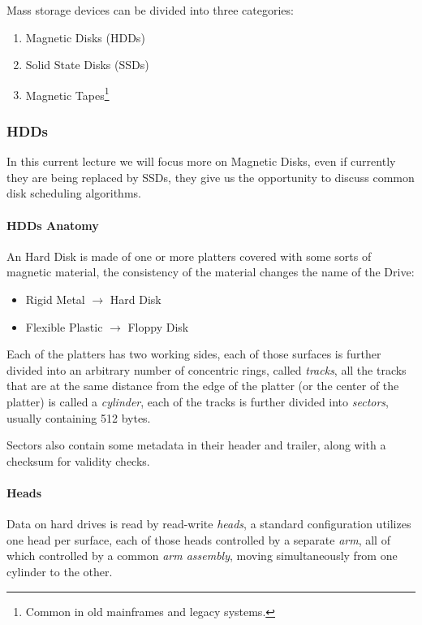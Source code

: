 \documentclass[openright, twoside]{report}
\theoremstyle{definition}
\theoremstyle{example}
\begin{document}
Mass storage devices can be divided into three categories:

\begin{enumerate}
	\item Magnetic Disks (HDDs)
	\item Solid State Disks (SSDs)
	\item Magnetic Tapes\footnote{Common in old mainframes and legacy systems.}
\end{enumerate}

\subsubsection{HDDs}

In this current lecture we will focus more on Magnetic Disks, even if currently they are 
being replaced by SSDs, they give us the opportunity to discuss common disk scheduling algorithms.

\paragraph{HDDs Anatomy}
An Hard Disk is made of one or more platters covered with some sorts of magnetic material, the 
consistency of the material changes the name of the Drive:


\begin{itemize}
	\item Rigid Metal $\to$ Hard Disk
	\item Flexible Plastic $\to$ Floppy Disk
\end{itemize}

Each of the platters has two working sides, each of those surfaces is further divided into an 
arbitrary number of concentric rings, called \emph{tracks}, all the tracks that are at the 
same distance from the edge of the platter (or the center of the platter) is called a \emph{cylinder}, 
each of the tracks is further divided into \emph{sectors}, usually containing 512 bytes.


Sectors also contain some metadata in their header and trailer, along with a checksum for validity checks.

\paragraph{Heads}
Data on hard drives is read by read-write \emph{heads}, a standard configuration utilizes one head per surface, 
each of those heads controlled by a separate \emph{arm}, all of which controlled by a common \emph{arm assembly}, moving 
simultaneously from one cylinder to the other.
\end{document}
